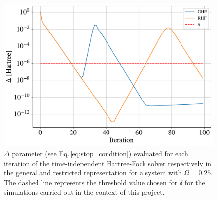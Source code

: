 \begin{figure}[t!]
    \centering
    \hspace{-15pt}
    \includegraphics[scale=0.38]{images/delta_at_every_step.pdf}
    \caption{$\Delta$ parameter (see Eq.\,\ref{eq:stop_condition}) evaluated for each iteration of the time-independent Hartree-Fock solver respectively in the general and restricted representation for a system with $\Omega=0.25$. The dashed line represents the threshold value chosen for $\delta$ for the simulations carried out in the context of this project.}
    \label{fig:delta_at_every_step}
\end{figure}



